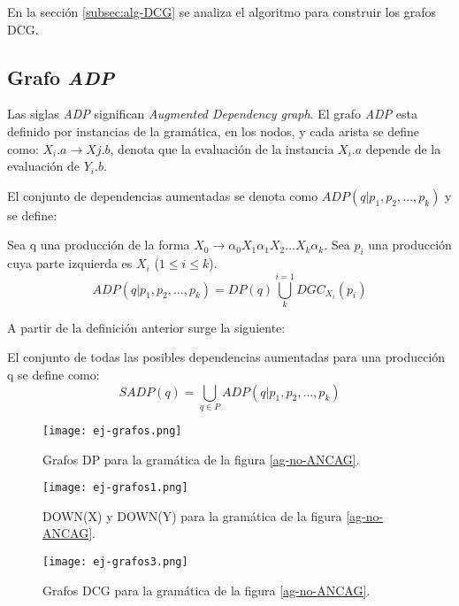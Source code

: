 En la sección \ref{subsec:alg-DCG} se analiza el algoritmo para construir los grafos DCG.

\subsection{Grafo \textit{ADP}}
\label{mag:adpdef}

Las siglas \textit{ADP} significan \textit{Augmented Dependency graph}. El grafo \textit{ADP} esta definido por instancias de la gramática, en los nodos, y cada arista se define como: $X_{i}.a\rightarrow X{j}.b$, denota que la evaluación de la instancia \textit{$X_{i}.a$} depende de la evaluación de \textit{$Y_{i}.b$}.

El conjunto de dependencias aumentadas se denota como $ADP (q | p_{1}, p_{2}, \dots, p_{k})$ y se define:
\begin{definition}
Sea q una producción de la forma $X_{0}\rightarrow \alpha_{0} X_{1} \alpha_{1} X_{2} \dots X_{k} \alpha_{k}$. Sea $p_{i}$ una producción cuya parte izquierda es $X_{i}$ ($1\leqslant i \leqslant k$). 
\begin{equation}
ADP (q | p_{1}, p_{2}, \dots, p_{k}) = DP(q) \bigcup\limits_{k}^{i=1}{DGC_{X_{i}}} (p_{i})
\end{equation}
\end{definition}

A partir de la definición anterior surge la siguiente:
\begin{definition}
El conjunto de todas las posibles dependencias aumentadas para una producción q se define como:
\begin{equation}
SADP(q) = \bigcup\limits_{q\in P}{ADP (q | p_{1}, p_{2}, \dots, p_{k})} 
\end{equation}
\end{definition}

\begin{figure}\centering
 \texttt{[image: ej-grafos.png]}
\caption{\label{dp-wuu-yang}Grafos DP para la gramática de la figura \ref{ag-no-ANCAG}.}
\end{figure}
\begin{figure}\centering
 \texttt{[image: ej-grafos1.png]}
\caption{\label{down-wuu-yang} DOWN(X) y DOWN(Y) para la gramática de la figura \ref{ag-no-ANCAG}.}
\end{figure}

\begin{figure}\centering
 \texttt{[image: ej-grafos3.png]}
\caption{\label{dcg-wuu-yang} Grafos DCG para la gramática de la figura \ref{ag-no-ANCAG}.}
\end{figure}

